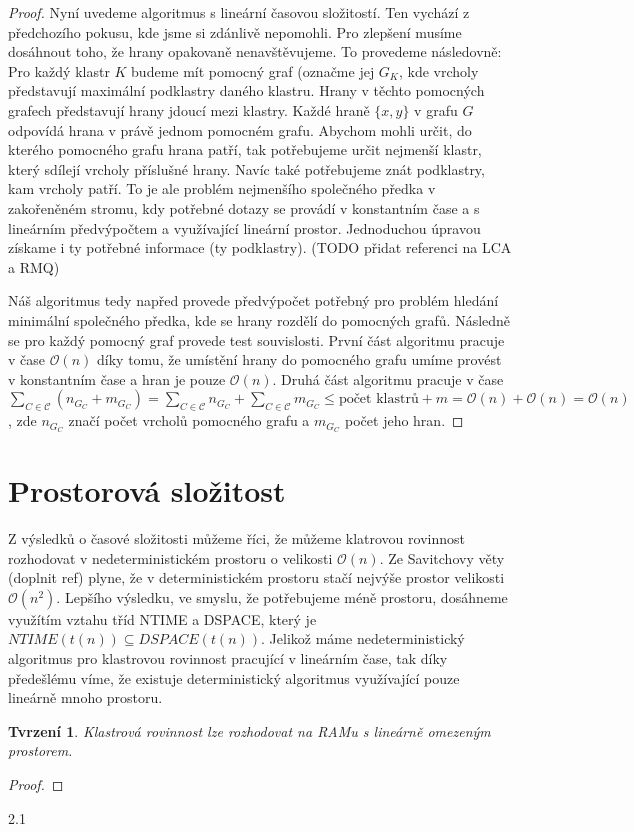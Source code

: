 \documentclass[12pt,a4report]{report}
\newtheorem{tvr}[theorem]{Tvrzení}
\theoremstyle{definition}
\begin{document}
\begin{proof}
Nyní uvedeme algoritmus s lineární časovou složitostí. Ten vychází z předchozího pokusu, kde jsme si zdánlivě nepomohli. Pro zlepšení musíme dosáhnout toho, že hrany opakovaně nenavštěvujeme. To provedeme následovně: Pro každý klastr $K$ budeme mít pomocný graf (označme jej $G_K$, kde vrcholy představují maximální podklastry daného klastru. Hrany v těchto pomocných grafech představují hrany jdoucí mezi klastry. Každé hraně $\{x,y\}$ v grafu $G$ odpovídá hrana v právě jednom pomocném grafu. Abychom mohli určit, do kterého pomocného grafu hrana patří, tak potřebujeme určit nejmenší klastr, který sdílejí vrcholy příslušné hrany. Navíc také potřebujeme znát podklastry, kam vrcholy patří. To je ale problém nejmenšího společného předka v zakořeněném stromu, kdy potřebné dotazy se provádí v konstantním čase a s lineárním předvýpočtem a využívající lineární prostor. Jednoduchou úpravou získame i ty potřebné informace (ty podklastry). (TODO přidat referenci na LCA a RMQ)

Náš algoritmus tedy napřed provede předvýpočet potřebný pro problém hledání minimální společného předka, kde se hrany rozdělí do pomocných grafů. Následně se pro každý pomocný graf provede test souvislosti. První část algoritmu pracuje v čase $\mathcal{O}(n)$ díky tomu, že umístění hrany do pomocného grafu umíme provést v konstantním čase a hran je pouze $\mathcal{O}(n)$. Druhá část algoritmu pracuje v čase $\sum\limits_{C \in \mathcal C}(n_{G_C}+m_{G_C}) = \sum\limits_{C \in \mathcal C}n_{G_C} + \sum\limits_{C \in \mathcal C}m_{G_C} \leq \text{počet klastrů} + m = \mathcal O(n) + \mathcal O(n)=\mathcal O(n)$, zde $n_{G_C}$ značí počet vrcholů pomocného grafu a $m_{G_C}$ počet jeho hran.
\end{proof}

\section{Prostorová složitost}
Z výsledků o časové složitosti můžeme říci, že můžeme klatrovou rovinnost rozhodovat v nedeterministickém prostoru o velikosti $\mathcal{O}(n)$. Ze Savitchovy věty (doplnit ref) plyne, že v deterministickém prostoru stačí nejvýše prostor velikosti $\mathcal{O}(n^2)$.
Lepšího výsledku, ve smyslu, že potřebujeme méně prostoru, dosáhneme využítím vztahu tříd NTIME a DSPACE, který je $NTIME(t(n)) \subseteq DSPACE(t(n))$. Jelikož máme nedeterministický algoritmus pro klastrovou rovinnost pracující v lineárním čase, tak díky předešlému víme, že existuje deterministický algoritmus využívající pouze lineárně mnoho prostoru.
\begin{tvr}
Klastrová rovinnost lze rozhodovat na RAMu s lineárně omezeným prostorem.
\end{tvr}
\begin{proof}
\end{proof}

2.1
\label{souv_klastry_det_alg}
\end{document}
